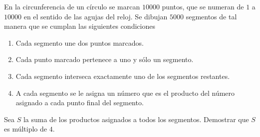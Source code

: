 En la circunferencia de un círculo se marcan $ 10000$ puntos, que se numeran de $ 1$ a $ 10000$ en el sentido de las agujas del reloj. Se dibujan $ 5000$ segmentos de tal manera que se cumplan las siguientes condiciones
\begin{enumerate}
    \item  Cada segmento une dos puntos marcados.
    \item  Cada punto marcado pertenece a uno y sólo un segmento.
    \item  Cada segmento interseca exactamente uno de los segmentos restantes.
    \item  A cada segmento se le asigna un número que es el producto del número asignado a cada punto final del segmento.
\end{enumerate}
Sea $ S$ la suma de los productos asignados a todos los segmentos.
Demostrar que $ S$ es múltiplo de $ 4$.
